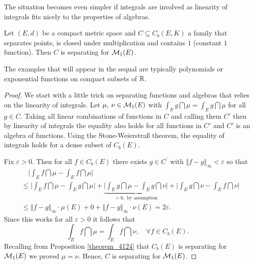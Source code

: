 The situation becomes even simpler if integrals are involved as linearity of integrals fits nicely to the properties of algebras.
\begin{laussagewerkzeug}
\begin{corollary}\label{cor_514}
	Let $(E,d)$ be a compact metric space and $C \subseteq C_b(E,K)$ a family that separates points, is closed under multiplication and contains $1$ (constant $1$ function). Then $C$ is separating for $\mathcal{M}_1(E)$.
\end{corollary}
\end{laussagewerkzeug}
The examples that will appear in the sequal are typically polynomials or exponential functions on compact subsets of $\mathbb{R}$.
\begin{proof}[Proof]
	We start with a little trick on separating functions and algebras that relies on the linearity of integrals. Let $\mu,\: \nu \in \mathcal{M}_1(E)$ with $\int_E g \dint \mu = \int_E g \dint \mu$ for all $g \in C$. Taking all linear combinations of functions in $C$ and calling them $C'$ then by linearity of integrals the equality also holds for all functions in $C'$ and $C'$ is an algebra of functions. Using the Stone-Weierstra\ss{} theorem, the equality of integrals holds for a dense subset of $C_b(E)$.
	\smallskip
	
	Fix $\varepsilon>0$. Then for all $f \in C_b(E)$ there exists $g \in C^{\prime}$ with $\left\Vert f - g \right\Vert_{\infty} < \varepsilon$ so that 
	\begin{align*}
		&\quad\Big| \int_E f \dint  \mu - \int_E f \dint \mu \Big|  \\ 
		&\leq \Big| \int_E f \dint \mu - \int_E g \dint \mu \Big| + \underbrace{\Big| \int_E g \dint \mu - \int_E g \dint \nu \Big|}_{= 0, \text{ by assumption}} + \Big| \int_E g \dint \nu - \int_E f \dint \nu \Big| \\
		&\leq \left\Vert f - g \right\Vert_{\infty} \cdot \mu(E) + 0 + \left\Vert f - g \right\Vert_{\infty} \cdot \nu(E) = 2 \varepsilon.
	\end{align*}
	Since this works for all $\varepsilon > 0$ it follows that $$\int_E f \dint \mu = \int_E f \dint \nu,\quad \forall f\in C_b(E).$$ Recalling from Proposition \ref{theorem_4124} that $C_b(E)$ is separating for $\mathcal{M}_1(E)$ we proved $\mu = \nu$. Hence, $C$ is separating for $\mathcal{M}_1(E)$.
\end{proof}

